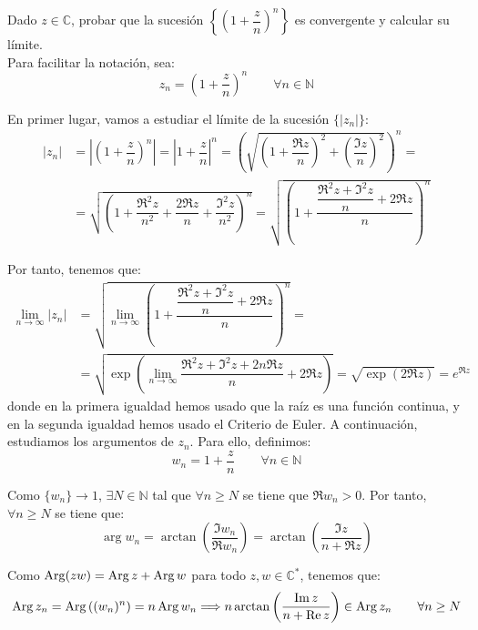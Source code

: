 \begin{ejercicio}
    Dado $z \in \mathbb{C}$, probar que la sucesión $\left\{\left(1 + \dfrac{z}{n}\right)^n\right\}$ es convergente y calcular su límite.\\

    Para facilitar la notación, sea:
    \begin{equation*}
        z_n = \left(1 + \dfrac{z}{n}\right)^n\qquad \forall n\in \mathbb{N}
    \end{equation*}

    En primer lugar, vamos a estudiar el límite de la sucesión $\{|z_n|\}$:
    \begin{align*}
        |z_n| &= \left|\left(1 + \dfrac{z}{n}\right)^n\right| = \left|1 + \dfrac{z}{n}\right|^n = \left(\sqrt{\left(1+\dfrac{\Re z}{n}\right)^2 + \left(\dfrac{\Im z}{n}\right)^2}\right)^n
        =\\&= \sqrt{\left(1 + \dfrac{\Re^2z}{n^2} + \dfrac{2\Re z}{n} + \dfrac{\Im^2 z}{n^2}\right)^{n}}
        = \sqrt{\left(1 + \dfrac{\dfrac{\Re^2z + \Im^2z}{n}+2\Re z}{n}\right)^{n}}
    \end{align*}

    Por tanto, tenemos que:
    \begin{align*}
        \lim_{n\to \infty}|z_n| &= \sqrt{\lim_{n\to \infty}\left(1 + \dfrac{\dfrac{\Re^2z + \Im^2z}{n}+2\Re z}{n}\right)^{n}}
        =\\&= \sqrt{\exp\left(\lim_{n\to \infty}\dfrac{\Re^2z + \Im^2z + 2n\Re z}{n}+2\Re z\right)}
        = \sqrt{\exp(2\Re z)} = e^{\Re z}
    \end{align*}
    donde en la primera igualdad hemos usado que la raíz es una función continua, y en la segunda igualdad hemos usado el Criterio de Euler. A continuación, estudiamos los argumentos de $z_n$. Para ello, definimos:
    \begin{equation*}
        w_n = 1 + \dfrac{z}{n}\qquad \forall n\in \mathbb{N}
    \end{equation*}

    Como $\{w_n\}\to 1$, $\exists N\in \mathbb{N}$ tal que $\forall n\geq N$ se tiene que $\Re w_n>0$. Por tanto, $\forall n\geq N$ se tiene que:
    \begin{equation*}
        \arg w_n = \arctan\left(\dfrac{\Im w_n}{\Re w_n}\right) = \arctan\left(\dfrac{\Im z}{n+\Re z}\right)
    \end{equation*}

    Como $\operatorname{Arg}(zw)=\operatorname{Arg} z + \operatorname{Arg} w$ para todo $z,w\in \mathbb{C}^{\ast}$, tenemos que:
    \begin{equation*}
        \operatorname{Arg} z_n = \operatorname{Arg} \left((w_n)^n\right) = n\operatorname{Arg} w_n \Longrightarrow
        n\arctan\left(\dfrac{\operatorname{Im} z}{n+\operatorname{Re} z}\right)\in \operatorname{Arg} z_n\qquad \forall n\geq N
    \end{equation*}


\end{ejercicio}
